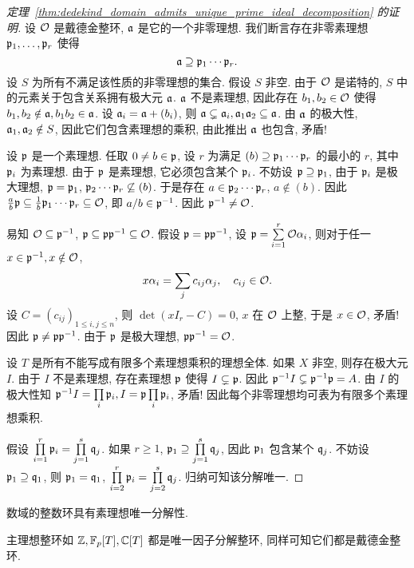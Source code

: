 \begin{proof}[定理~\ref{thm:dedekind_domain_admits_unique_prime_ideal_decomposition} 的证明]
设 $\CO$ 是戴德金整环, $\fa$ 是它的一个非零理想. 我们断言存在非零素理想 $\fp_1,\dots,\fp_r$ 使得 
  \[\fa\supseteq \fp_1\cdots\fp_r.\]
设 $S$ 为所有不满足该性质的非零理想的集合. 假设 $S$ 非空. 由于 $\CO$ 是诺特的, $S$ 中的元素关于包含关系拥有极大元 $\fa$. $\fa$ 不是素理想, 因此存在 $b_1,b_2\in\CO$ 使得 $b_1,b_2\notin\fa,b_1b_2\in\fa$. 设 $\fa_i=\fa+(b_i)$, 则 $\fa\subsetneq \fa_i,\fa_1\fa_2\subseteq \fa$. 由 $\fa$ 的极大性, $\fa_1,\fa_2\notin S$, 因此它们包含素理想的乘积, 由此推出 $\fa$ 也包含, 矛盾!

设 $\fp$ 是一个素理想. 任取 $0\neq b\in\fp$, 设 $r$ 为满足 $(b)\supseteq \fp_1\cdots\fp_r$ 的最小的 $r$, 其中 $\fp_i$ 为素理想. 由于 $\fp$ 是素理想, 它必须包含某个 $\fp_i$. 不妨设 $\fp\supseteq \fp_1$, 由于 $\fp_i$ 是极大理想, $\fp=\fp_1$, $\fp_2\cdots\fp_r\not\subseteq (b)$. 于是存在 $a\in\fp_2\cdots\fp_r$, $a\notin(b)$. 因此 $\frac{a}{b}\fp\subseteq \frac{1}{b}\fp_1\cdots\fp_r\subseteq \CO$, 即 $a/b\in\fp^{-1}$. 因此 $\fp^{-1}\neq\CO$. 

易知 $\CO\subseteq \fp^{-1}$, $\fp\subseteq\fp\fp^{-1}\subseteq\CO$. 假设 $\fp=\fp\fp^{-1}$, 设 $\fp=\suml_{i=1}^r \CO \alpha_i$, 则对于任一 $x\in\fp^{-1},x\notin \CO$,
  \[x\alpha_i=\sum_j c_{ij} \alpha_j,\quad c_{ij}\in \CO.\]
设 $C=(c_{ij})_{1\le i,j\le n}$, 则 $\det(xI_r-C)=0$, $x$ 在 $\CO$ 上整, 于是 $x\in \CO$, 矛盾! 因此 $\fp\neq \fp\fp^{-1}$. 由于 $\fp$ 是极大理想, $\fp\fp^{-1}=\CO$. 

设 $T$ 是所有不能写成有限多个素理想乘积的理想全体. 如果 $X$ 非空, 则存在极大元 $I$. 由于 $I$ 不是素理想, 存在素理想 $\fp$ 使得 $I\subsetneq \fp$. 因此 $\fp^{-1}I\subsetneq \fp^{-1}\fp=A$. 由 $I$ 的极大性知 $\fp^{-1}I=\prod\limits_i \fp_i, I=\fp\prod\limits_i \fp_i$, 矛盾! 因此每个非零理想均可表为有限多个素理想乘积.

假设 $\prod\limits_{i=1}^r\fp_i=\prod\limits_{j=1}^s \fq_j$. 如果 $r\ge 1$, $\fp_1\supseteq \prod\limits_{j=1}^s \fq_j$, 因此 $\fp_1$ 包含某个 $\fq_j$. 不妨设 $\fp_1\supseteq \fq_1$, 则 $\fp_1=\fq_1$, $\prod\limits_{i=2}^r\fp_i=\prod\limits_{j=2}^s \fq_j$. 归纳可知该分解唯一.
\end{proof}

\begin{corollary}{}{}
数域的整数环具有素理想唯一分解性.
\end{corollary}

主理想整环如 $\BZ,\BF_p[T],\BC[T]$ 都是唯一因子分解整环, 同样可知它们都是戴德金整环.

